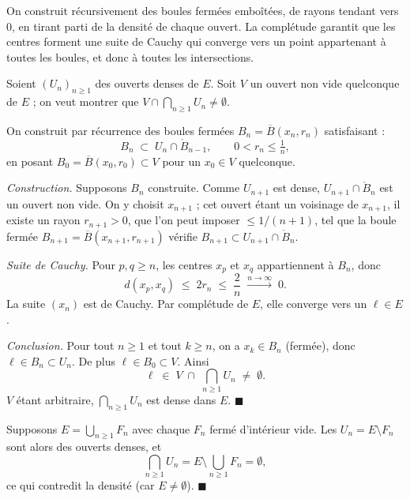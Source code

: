 \begin{ideepreuve}
On construit récursivement des boules fermées emboîtées, de rayons tendant
vers $0$, en tirant parti de la densité de chaque ouvert. La complétude
garantit que les centres forment une suite de Cauchy qui converge vers un point
appartenant à toutes les boules, et donc à toutes les intersections.
\end{ideepreuve}


\begin{mdframed}[style=proofbar]
  Soient $(U_n)_{n \geq 1}$ des ouverts denses de $E$. Soit $V$ un ouvert
  non vide quelconque de $E$ ; on veut montrer que $V \cap \bigcap_{n \geq 1} U_n
  \neq \emptyset$.

  \medskip
  On construit par récurrence des boules fermées $B_n = \overline{B}(x_n, r_n)$
  satisfaisant :
  \[
    B_n \;\subset\; U_n \cap \mathring{B}_{n-1}, \qquad 0 < r_n \leq \tfrac{1}{n},
  \]
  en posant $B_0 = \overline{B}(x_0, r_0) \subset V$ pour un $x_0 \in V$
  quelconque.

  \medskip
  \textit{Construction.} Supposons $B_n$ construite. Comme $U_{n+1}$ est dense,
  $U_{n+1} \cap \mathring{B}_n$ est un ouvert non vide. On y choisit
  $x_{n+1}$ ; cet ouvert étant un voisinage de $x_{n+1}$, il existe un rayon
  $r_{n+1} > 0$, que l'on peut imposer $\leq 1/(n+1)$, tel que la boule
  fermée $B_{n+1} = \overline{B}(x_{n+1}, r_{n+1})$ vérifie
  $B_{n+1} \subset U_{n+1} \cap \mathring{B}_n$.

  \medskip
  \textit{Suite de Cauchy.} Pour $p, q \geq n$, les centres $x_p$ et $x_q$
  appartiennent à $B_n$, donc
  \[
    d(x_p, x_q) \;\leq\; 2r_n \;\leq\; \frac{2}{n} \;\xrightarrow{n\to\infty}\; 0.
  \]
  La suite $(x_n)$ est de Cauchy. Par complétude de $E$, elle converge vers
  un $\ell \in E$.

  \medskip
  \textit{Conclusion.} Pour tout $n \geq 1$ et tout $k \geq n$, on a
  $x_k \in B_n$ (fermée), donc $\ell \in B_n \subset U_n$.
  De plus $\ell \in B_0 \subset V$. Ainsi
  \[
    \ell \;\in\; V \;\cap\; \bigcap_{n \geq 1} U_n \;\neq\; \emptyset.
  \]
  $V$ étant arbitraire, $\bigcap_{n \geq 1} U_n$ est dense dans $E$.
  $\blacksquare$
\end{mdframed}


\begin{mdframed}[style=proofbar]
  Supposons $E = \bigcup_{n \geq 1} F_n$ avec chaque $F_n$ fermé d'intérieur
  vide. Les $U_n = E \setminus F_n$ sont alors des ouverts denses, et
  \[
    \bigcap_{n \geq 1} U_n = E \setminus \bigcup_{n \geq 1} F_n = \emptyset,
  \]
  ce qui contredit la densité (car $E \neq \emptyset$).
  $\blacksquare$
\end{mdframed}

